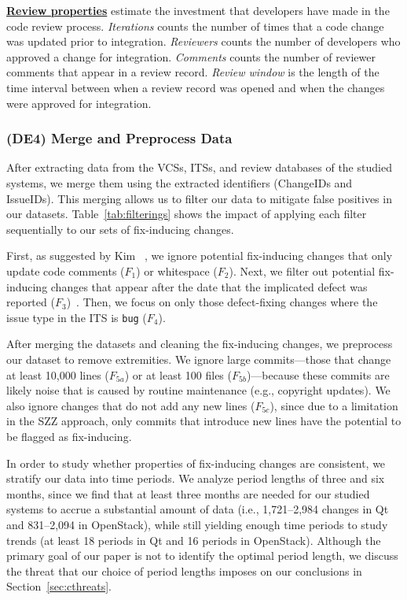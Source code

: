 \underline{\bf Review properties} estimate the investment that developers have made in the code review process.
{\em Iterations} counts the number of times that a code change was updated prior to integration.
{\em Reviewers} counts the number of developers who approved a change for integration.
{\em Comments} counts the number of reviewer comments that appear in a review record.
{\em Review window} is the length of the time interval between when a review record was opened and when the changes were approved for integration.



\subsubsection*{(DE4) Merge and Preprocess Data}
\label{sec:cleaning}

After extracting data from the VCSs, ITSs, and review databases of the studied systems, we merge them using the extracted identifiers (ChangeIDs and IssueIDs).
This merging allows us to filter our data to mitigate false positives in our datasets.
Table~\ref{tab:filterings} shows the impact of applying each filter sequentially to our sets of fix-inducing changes.

First, as suggested by Kim \ea~\cite{kim2006ase}, we ignore potential fix-inducing changes that only update code comments ($F_1$) or whitespace ($F_2$). 
Next, we filter out potential fix-inducing changes that appear after the date that the implicated defect was reported ($F_3$)~\cite{sliwerski2005msr}.
Then, we focus on only those defect-fixing changes where the issue type in the ITS is {\tt bug} ($F_4$).

After merging the datasets and cleaning the fix-inducing changes, we preprocess our dataset to remove extremities.
We ignore large commits---those that change at least 10,000 lines ($F_{5a}$) or at least 100 files ($F_{5b}$)---because these commits are likely noise that is caused by routine maintenance (e.g., copyright updates).
We also ignore changes that do not add any new lines ($F_{5c}$), since due to a limitation in the SZZ approach, only commits that introduce new lines have the potential to be flagged as fix-inducing.

In order to study whether properties of fix-inducing changes are consistent, we stratify our data into time periods.
We analyze period lengths of three and six months, since we find that at least three months are needed for our studied systems to accrue a substantial amount of data (i.e., 1,721--2,984 changes in {\sc Qt} and 831--2,094 in {\sc OpenStack}), while still yielding enough time periods to study trends (at least 18 periods in {\sc Qt} and 16 periods in {\sc OpenStack}).
Although the primary goal of our paper is not to identify the optimal period length, we discuss the threat that our choice of period lengths imposes on our conclusions in Section~\ref{sec:cthreats}.

